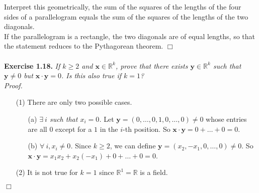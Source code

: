 \documentclass{article}
\begin{document}
Interpret this geometrically,
the sum of the squares of the lengths of the four sides of a parallelogram
equals the sum of the squares of the lengths of the two diagonals. \\

If the parallelogram is a rectangle, the two diagonals are of equal lengths,
so that the statement reduces to the Pythagorean theorem.
$\Box$ \\\\






\textbf{Exercise 1.18.}
\emph{If $k \geq 2$ and $\mathbf{x} \in \mathbb{R}^k$,
prove that there exists $\mathbf{y} \in \mathbb{R}^k$ such that
$\mathbf{y} \neq 0$ but $\mathbf{x} \cdot \mathbf{y} = 0$.
Is this also true if $k = 1$?} \\

\emph{Proof.}
\begin{enumerate}
\item[(1)]
There are only two possible cases.
  \begin{enumerate}
  \item[(a)]
  \emph{$\exists \: i$ such that $x_i = 0$.}
  Let $\mathbf{y} = (0, \ldots, 0, 1, 0, \ldots, 0) \neq 0$
  whose entries are all $0$ except for a $1$ in the $i$-th position.
  So $\mathbf{x} \cdot \mathbf{y} = 0 + \ldots + 0 = 0$.
  \item[(b)]
  \emph{$\forall \: i, x_i \neq 0$.}
  Since $k \geq 2$, we can define
  $\mathbf{y} = (x_2, -x_1, 0, \ldots, 0) \neq 0.$
  So $\mathbf{x} \cdot \mathbf{y} = x_1 x_2 + x_2 (-x_1) + 0 + \ldots + 0 = 0$.
  \end{enumerate}
\item[(2)]
It is not true for $k = 1$ since $\mathbb{R}^1 = \mathbb{R}$ is a field. \\
\end{enumerate}
$\Box$ \\\\



\end{document}
